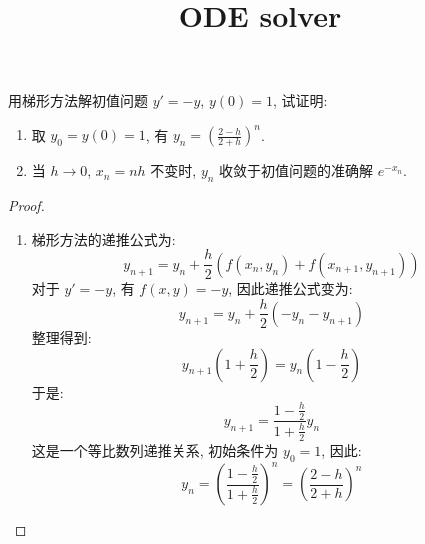 \documentclass[lang = zh]{iwork}
\title{ODE solver}
\begin{document}
\maketitle

\begin{prob}
  用梯形方法解初值问题 $y' = -y$, $y(0) = 1$, 试证明:
  \begin{enumerate}
    \item 取 $y_0 = y(0) = 1$, 有 $y_n = \left(\frac{2 - h}{2 + h}\right)^n$.
    \item 当 $h \to 0$, $x_n = n h$ 不变时, $y_n$ 收敛于初值问题的准确解 $e^{-x_n}$.
  \end{enumerate}
\end{prob}
\begin{proof} ~
  \begin{enumerate}
    \item 梯形方法的递推公式为:
          \begin{equation*}
            y_{n+1} = y_n + \frac{h}{2} \left( f(x_n, y_n) + f(x_{n+1}, y_{n+1}) \right)
          \end{equation*}
          对于 $y' = -y$, 有 $f(x, y) = -y$, 因此递推公式变为:
          \begin{equation*}
            y_{n+1} = y_n + \frac{h}{2} \left( -y_n - y_{n+1} \right)
          \end{equation*}
          整理得到:
          \begin{equation*}
            y_{n+1} \left(1 + \frac{h}{2}\right) = y_n \left(1 - \frac{h}{2}\right)
          \end{equation*}
          于是:
          \begin{equation*}
            y_{n+1} = \frac{1 - \frac{h}{2}}{1 + \frac{h}{2}} y_n
          \end{equation*}
          这是一个等比数列递推关系, 初始条件为 $y_0 = 1$, 因此:
          \begin{equation*}
            y_n
            = \left(\frac{1 - \frac{h}{2}}{1 + \frac{h}{2}}\right)^n
            = \left(\frac{2 - h}{2 + h}\right)^n
          \end{equation*}

\end{enumerate}
\end{proof}
\end{document}
